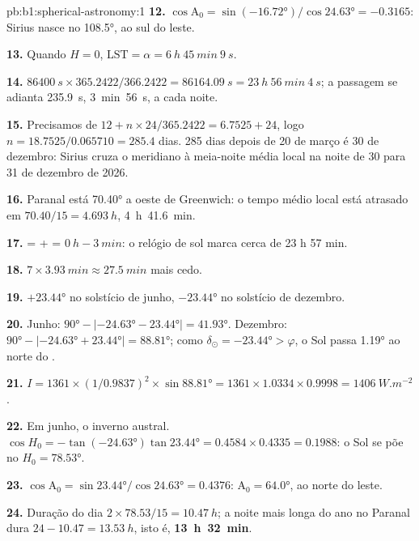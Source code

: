 \begin{solution}{pb:b1:spherical-astronomy:1}
\textbf{12.} $\cos\mathrm{A}_0 = \sin(\ang{-16.72})/\cos\ang{24.63} =
-0.3165$: Sirius nasce no  \ang{108.5}, ao sul do leste.

\textbf{13.} Quando $H = 0$, $\mathrm{LST} = \alpha = \qty{6}{h}~\qty{45}{min}~\qty{9}{s}$.

\textbf{14.} $\qty{86400}{s}\times365.2422/366.2422 = \qty{86164.09}{s} =
\qty{23}{h}~\qty{56}{min}~\qty{4}{s}$; a passagem se adianta
\qty{235.9}{s}, \qty{3}{min}~\qty{56}{s}, a cada noite.

\textbf{15.} Precisamos de $12 + n\times24/365.2422 = 6.7525 + 24$, logo
$n = 18.7525/0.065710 = 285.4$ dias. 285 dias depois de 20 de março é
30 de dezembro: Sirius cruza o meridiano à meia-noite média local na noite
de 30 para 31 de dezembro de 2026.

\textbf{16.} Paranal está \ang{70.40} a oeste de Greenwich: o tempo médio local está
atrasado em $70.40/15 = \qty{4.693}{h}$, \qty{4}{h}~\qty{41.6}{min}.

\textbf{17.}  =  +  =
$\qty{0}{h} - \qty{3}{min}$: o relógio de sol marca cerca de 23 h 57 min.

\textbf{18.} $7\times\qty{3.93}{min} \approx \qty{27.5}{min}$ mais cedo.

\textbf{19.} $+\ang{23.44}$ no solstício de junho, $-\ang{23.44}$ no
solstício de dezembro.

\textbf{20.} Junho: $\ang{90} - |\ang{-24.63} - \ang{23.44}| = \ang{41.93}$.
Dezembro: $\ang{90} - |\ang{-24.63} + \ang{23.44}| = \ang{88.81}$; como
$\delta_\odot = \ang{-23.44} > \varphi$, o Sol passa \ang{1.19} ao norte do
.

\textbf{21.} $I = 1361\times(1/0.9837)^2\times\sin\ang{88.81} = 1361\times
1.0334\times0.9998 = \qty{1406}{W.m^{-2}}$.

\textbf{22.} Em junho, o inverno austral. $\cos H_0 = -\tan(\ang{-24.63})
\tan\ang{23.44} = 0.4584\times0.4335 = 0.1988$: o Sol se põe no 
$H_0 = \ang{78.53}$.

\textbf{23.} $\cos\mathrm{A}_0 = \sin\ang{23.44}/\cos\ang{24.63} = 0.4376$:
$\mathrm{A}_0 = \ang{64.0}$, ao norte do leste.

\textbf{24.} Duração do dia $2\times78.53/15 = \qty{10.47}{h}$; a noite mais longa
do ano no Paranal dura $24 - 10.47 = \qty{13.53}{h}$, isto é,
\textbf{\qty[text-series-to-math=true]{13}{h}~\qty[text-series-to-math=true]{32}{min}}.
\end{solution}
